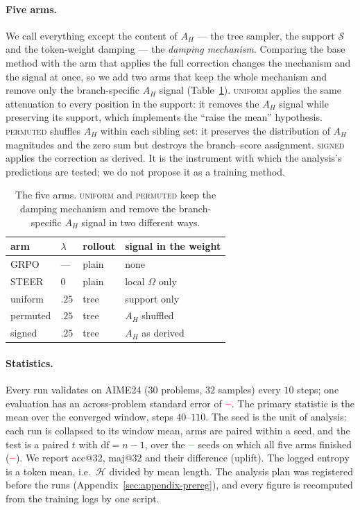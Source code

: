 \documentclass[11pt]{article}
\newcommand{\Htraj}{\mathcal{H}}
\newcommand{\AH}{A_{H}}
\newcommand{\Om}{\Omega}
\providecommand{\PENDING}{\textcolor{red}{\textbf{--}}}
\newcommand{\num}[1]{\ifcsname #1\endcsname\csname #1\endcsname\else\PENDING\fi}
\begin{document}
\paragraph{Five arms.} We call everything except the content of $\AH$ --- the tree
sampler, the support $\mathcal{S}$ and the token-weight damping --- the \emph{damping
mechanism}. Comparing the base method with the arm that applies the full correction changes the mechanism and
the signal at once, so we add two arms that keep the whole mechanism and remove only
the branch-specific $\AH$ signal (Table~\ref{tab:arms}). \textsc{uniform} applies the
same attenuation to every position in the support: it removes the $\AH$ signal while
preserving its support, which implements the ``raise the mean'' hypothesis.
\textsc{permuted} shuffles $\AH$ within each sibling set: it preserves the distribution
of $\AH$ magnitudes and the zero sum but destroys the branch--score assignment.
\textsc{signed} applies the correction as derived. It is the instrument with which the
analysis's predictions are tested; we do not propose it as a training method.

\begin{table}[t]
\centering
\footnotesize
\setlength{\tabcolsep}{4pt}
\begin{tabular}{@{}llll@{}}
\toprule
arm & $\lambda$ & rollout & signal in the weight \\
\midrule
GRPO      & ---   & plain & none \\
STEER     & $0$   & plain & local $\Om$ only \\
uniform   & $.25$ & tree  & support only \\
permuted  & $.25$ & tree  & $\AH$ shuffled \\
signed  & $.25$ & tree & $\AH$ as derived \\
\bottomrule
\end{tabular}
\caption{The five arms. \textsc{uniform} and \textsc{permuted} keep the damping
mechanism and remove the branch-specific $\AH$ signal in two different ways.}
\label{tab:arms}
\end{table}

\paragraph{Statistics.} Every run validates on AIME24 ($30$ problems, $32$ samples)
every $10$ steps; one evaluation has an across-problem standard error of
$\num{SEaime}$. The primary statistic is the mean over the converged window, steps
$40$--$110$. The seed is the unit of analysis: each run is collapsed to its window
mean, arms are paired within a seed, and the test is a paired $t$ with
$\mathrm{df} = n - 1$, over the $\num{Nseedsused}$ seeds on which all five arms
finished ($\num{Seedset}$). We report acc@32, maj@32 and their difference (uplift).
The logged entropy is a token mean, i.e.\ $\Htraj$ divided by mean length. The
analysis plan was registered before the runs (Appendix~\ref{sec:appendix-prereg}), and
every figure is recomputed from the training logs by one script.
\end{document}
